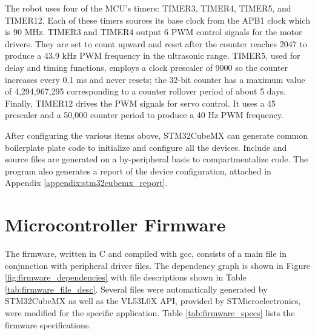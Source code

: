 The robot uses four of the MCU's timers: TIMER3, TIMER4, TIMER5, and TIMER12. Each of these timers sources its base clock from the APB1 clock which is 90 MHz. TIMER3 and TIMER4 output 6 PWM control signals for the motor drivers. They are set to count upward and reset after the counter reaches 2047 to produce a 43.9 kHz PWM frequency in the ultrasonic range. TIMER5, used for delay and timing functions, employs a clock prescaler of 9000 so the counter increases every 0.1 ms and never resets; the 32-bit counter has a maximum value of 4,294,967,295 corresponding to a counter rollover period of about 5 days. Finally, TIMER12 drives the PWM signals for servo control. It uses a 45 prescaler and a 50,000 counter period to produce a 40 Hz PWM frequency.

After configuring the various items above, STM32CubeMX can generate common boilerplate plate code to initialize and configure all the devices. Include and source files are generated on a by-peripheral basis to compartmentalize code. The program also generates a report of the device configuration, attached in Appendix \ref{appendix:stm32cubemx_report}.

\section{Microcontroller Firmware}
The firmware, written in C and compiled with gcc, consists of a main file in conjunction with peripheral driver files. The dependency graph is shown in Figure \ref{fig:firmware_dependencies} with file descriptions shown in Table \ref{tab:firmware_file_desc}. Several files were automatically generated by STM32CubeMX as well as the VL53L0X API, provided by STMicroelectronics, were modified for the specific application. Table \ref{tab:firmware_specs} lists the firmware specifications.

